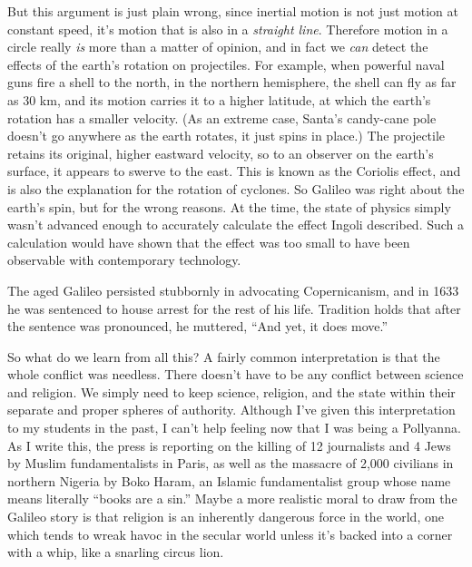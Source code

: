 But this argument is just plain wrong, since inertial motion is not just motion at constant
speed, it's motion that is also in a \emph{straight line}. Therefore motion in a circle really
\emph{is} more than a matter of opinion, and in fact we \emph{can} detect the effects of
the earth's rotation on projectiles. For example, when powerful naval guns fire a shell to the
north, in the northern hemisphere, the shell can fly as far as 30 km, and its motion carries it
to a higher latitude, at which the earth's rotation has a smaller velocity. (As an extreme
case, Santa's candy-cane pole doesn't go anywhere as the earth rotates, it just spins in place.)
The projectile retains its original, higher eastward velocity, so to an observer on the earth's
surface, it appears to swerve to the east. This is known as the Coriolis effect, and is also
the explanation for the rotation of cyclones. So Galileo was right about the earth's spin, but
for the wrong reasons. At the time, the state of physics simply wasn't advanced enough to
accurately calculate the effect Ingoli described. Such a calculation would have shown that the
effect was too small to have been observable with contemporary technology.

The aged Galileo persisted stubbornly in advocating Copernicanism, and in
1633 he was sentenced to house arrest for the rest of his life. Tradition holds that after the
sentence was pronounced, he muttered, ``And yet, it does move.''

So what do we learn from all this? A fairly common interpretation is that the whole conflict
was needless. There doesn't have to be any conflict between science and religion. We simply need
to keep science, religion, and the state within their separate and proper spheres of authority.
Although I've given this interpretation to my students in the past, I can't help feeling now
that I was being a Pollyanna. As I write this, the press is reporting on the killing of 12
journalists and 4 Jews by Muslim fundamentalists in Paris, as well as the massacre of
2,000 civilians in northern Nigeria by Boko Haram, an Islamic fundamentalist group whose
name means literally ``books are a sin.'' Maybe a more realistic moral to draw from
the Galileo story is that religion is an inherently dangerous force in the world, one which
tends to wreak havoc in the secular world unless it's backed into a corner with a whip,
like a snarling circus lion.
